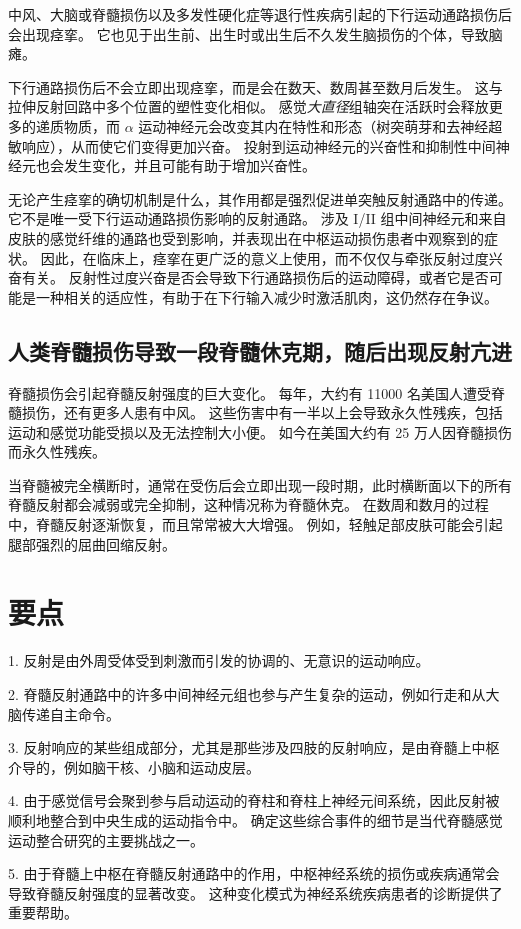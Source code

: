 中风、大脑或脊髓损伤以及多发性硬化症等退行性疾病引起的下行运动通路损伤后会出现痉挛。
它也见于出生前、出生时或出生后不久发生脑损伤的个体，导致脑瘫。


下行通路损伤后不会立即出现痉挛，而是会在数天、数周甚至数月后发生。
这与拉伸反射回路中多个位置的塑性变化相似。
感觉\textit{大直径}组轴突在活跃时会释放更多的递质物质，而 $ \alpha $ 运动神经元会改变其内在特性和形态（树突萌芽和去神经超敏响应），从而使它们变得更加兴奋。
投射到运动神经元的兴奋性和抑制性中间神经元也会发生变化，并且可能有助于增加兴奋性。


无论产生痉挛的确切机制是什么，其作用都是强烈促进单突触反射通路中的传递。
它不是唯一受下行运动通路损伤影响的反射通路。
涉及 I/II 组中间神经元和来自皮肤的感觉纤维的通路也受到影响，并表现出在中枢运动损伤患者中观察到的症状。
因此，在临床上，痉挛在更广泛的意义上使用，而不仅仅与牵张反射过度兴奋有关。
反射性过度兴奋是否会导致下行通路损伤后的运动障碍，或者它是否可能是一种相关的适应性，有助于在下行输入减少时激活肌肉，这仍然存在争议。



\subsection{人类脊髓损伤导致一段脊髓休克期，随后出现反射亢进}

脊髓损伤会引起脊髓反射强度的巨大变化。
每年，大约有 11000 名美国人遭受脊髓损伤，还有更多人患有中风。
这些伤害中有一半以上会导致永久性残疾，包括运动和感觉功能受损以及无法控制大小便。
如今在美国大约有 25 万人因脊髓损伤而永久性残疾。


当脊髓被完全横断时，通常在受伤后会立即出现一段时期，此时横断面以下的所有脊髓反射都会减弱或完全抑制，这种情况称为脊髓休克。
在数周和数月的过程中，脊髓反射逐渐恢复，而且常常被大大增强。
例如，轻触足部皮肤可能会引起腿部强烈的屈曲回缩反射。



\section{要点}

1. 反射是由外周受体受到刺激而引发的协调的、无意识的运动响应。


2. 脊髓反射通路中的许多中间神经元组也参与产生复杂的运动，例如行走和从大脑传递自主命令。


3. 反射响应的某些组成部分，尤其是那些涉及四肢的反射响应，是由脊髓上中枢介导的，例如脑干核、小脑和运动皮层。


4. 由于感觉信号会聚到参与启动运动的脊柱和脊柱上神经元间系统，因此反射被顺利地整合到中央生成的运动指令中。
确定这些综合事件的细节是当代脊髓感觉运动整合研究的主要挑战之一。


5. 由于脊髓上中枢在脊髓反射通路中的作用，中枢神经系统的损伤或疾病通常会导致脊髓反射强度的显著改变。
这种变化模式为神经系统疾病患者的诊断提供了重要帮助。

